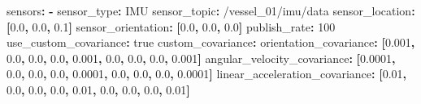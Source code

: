 \documentclass[
  letterpaper,
  DIV=11,
  numbers=noendperiod]{scrreprt}
\newenvironment{Shaded}{\begin{snugshade}}{\end{snugshade}}
\newcommand{\AttributeTok}[1]{\textcolor[rgb]{0.40,0.45,0.13}{#1}}
\newcommand{\CharTok}[1]{\textcolor[rgb]{0.13,0.47,0.30}{#1}}
\newcommand{\DecValTok}[1]{\textcolor[rgb]{0.68,0.00,0.00}{#1}}
\newcommand{\FloatTok}[1]{\textcolor[rgb]{0.68,0.00,0.00}{#1}}
\newcommand{\FunctionTok}[1]{\textcolor[rgb]{0.28,0.35,0.67}{#1}}
\newcommand{\KeywordTok}[1]{\textcolor[rgb]{0.00,0.23,0.31}{\textbf{#1}}}
\begin{document}
\begin{Shaded}
\begin{Highlighting}[]
\FunctionTok{sensors}\KeywordTok{:}
\AttributeTok{  }\KeywordTok{{-}}\AttributeTok{ }
\AttributeTok{    }\FunctionTok{sensor\_type}\KeywordTok{:}\AttributeTok{ IMU}
\AttributeTok{    }\FunctionTok{sensor\_topic}\KeywordTok{:}\AttributeTok{ /vessel\_01/imu/data}
\AttributeTok{    }\FunctionTok{sensor\_location}\KeywordTok{:}\AttributeTok{ }\KeywordTok{[}\FloatTok{0.0}\KeywordTok{,}\AttributeTok{ }\FloatTok{0.0}\KeywordTok{,}\AttributeTok{ }\FloatTok{0.1}\KeywordTok{]}
\AttributeTok{    }\FunctionTok{sensor\_orientation}\KeywordTok{:}\AttributeTok{ }\KeywordTok{[}\FloatTok{0.0}\KeywordTok{,}\AttributeTok{ }\FloatTok{0.0}\KeywordTok{,}\AttributeTok{ }\FloatTok{0.0}\KeywordTok{]}
\AttributeTok{    }\FunctionTok{publish\_rate}\KeywordTok{:}\AttributeTok{ }\DecValTok{100}
\AttributeTok{    }\FunctionTok{use\_custom\_covariance}\KeywordTok{:}\AttributeTok{ }\CharTok{true}
\AttributeTok{    }\FunctionTok{custom\_covariance}\KeywordTok{:}
\AttributeTok{      }\FunctionTok{orientation\_covariance}\KeywordTok{:}\AttributeTok{ }\KeywordTok{[}\FloatTok{0.001}\KeywordTok{,}\AttributeTok{ }\FloatTok{0.0}\KeywordTok{,}\AttributeTok{ }\FloatTok{0.0}\KeywordTok{,}\AttributeTok{ }\FloatTok{0.0}\KeywordTok{,}\AttributeTok{ }\FloatTok{0.001}\KeywordTok{,}\AttributeTok{ }\FloatTok{0.0}\KeywordTok{,}\AttributeTok{ }\FloatTok{0.0}\KeywordTok{,}\AttributeTok{ }\FloatTok{0.0}\KeywordTok{,}\AttributeTok{ }\FloatTok{0.001}\KeywordTok{]}
\AttributeTok{      }\FunctionTok{angular\_velocity\_covariance}\KeywordTok{:}\AttributeTok{ }\KeywordTok{[}\FloatTok{0.0001}\KeywordTok{,}\AttributeTok{ }\FloatTok{0.0}\KeywordTok{,}\AttributeTok{ }\FloatTok{0.0}\KeywordTok{,}\AttributeTok{ }\FloatTok{0.0}\KeywordTok{,}\AttributeTok{ }\FloatTok{0.0001}\KeywordTok{,}\AttributeTok{ }\FloatTok{0.0}\KeywordTok{,}\AttributeTok{ }\FloatTok{0.0}\KeywordTok{,}\AttributeTok{ }\FloatTok{0.0}\KeywordTok{,}\AttributeTok{ }\FloatTok{0.0001}\KeywordTok{]}
\AttributeTok{      }\FunctionTok{linear\_acceleration\_covariance}\KeywordTok{:}\AttributeTok{ }\KeywordTok{[}\FloatTok{0.01}\KeywordTok{,}\AttributeTok{ }\FloatTok{0.0}\KeywordTok{,}\AttributeTok{ }\FloatTok{0.0}\KeywordTok{,}\AttributeTok{ }\FloatTok{0.0}\KeywordTok{,}\AttributeTok{ }\FloatTok{0.01}\KeywordTok{,}\AttributeTok{ }\FloatTok{0.0}\KeywordTok{,}\AttributeTok{ }\FloatTok{0.0}\KeywordTok{,}\AttributeTok{ }\FloatTok{0.0}\KeywordTok{,}\AttributeTok{ }\FloatTok{0.01}\KeywordTok{]}
\end{Highlighting}
\end{Shaded}
\end{document}
